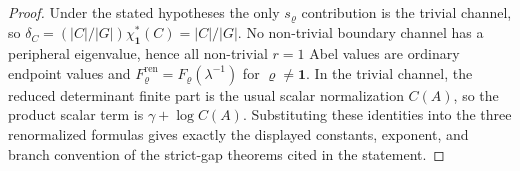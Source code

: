 \begin{proof}
  Under the stated hypotheses the only \(s_\varrho\) contribution is the
  trivial channel, so
  \(\delta_C=(|C|/|G|)\chi_{\mathbf1}^\ast(C)=|C|/|G|\).  No non-trivial
  boundary channel has a peripheral eigenvalue, hence all non-trivial
  \(r=1\) Abel values are ordinary endpoint values and
  \(F_\varrho^{\mathrm{ren}}=F_\varrho(\lambda^{-1})\) for
  \(\varrho\ne\mathbf1\).  In the trivial channel, the reduced determinant
  finite part is the usual scalar normalization \(C(A)\), so the product
  scalar term is \(\gamma+\log C(A)\).  Substituting these identities into
  the three renormalized formulas gives exactly the displayed constants,
  exponent, and branch convention of the strict-gap theorems cited in the
  statement.
\end{proof}

